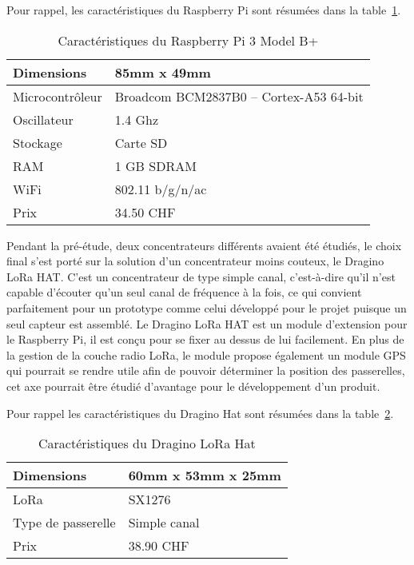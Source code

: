 Pour rappel, les caractéristiques du Raspberry Pi sont résumées dans la table~\ref{tab:raspberry_cara}.

\begin{table}[htb]
\caption{Caractéristiques du Raspberry Pi 3 Model B+}
\label{tab:raspberry_cara}
\centering
\begin{tabular}{ l | l }
\toprule
Dimensions & 85mm x 49mm \\
\midrule
Microcontrôleur & Broadcom BCM2837B0 – Cortex-A53 64-bit \\
\midrule
Oscillateur & 1.4 Ghz \\
\midrule
Stockage & Carte SD \\
\midrule
RAM & 1 GB SDRAM \\
\midrule
WiFi & 802.11 b/g/n/ac \\
\midrule
Prix & 34.50 CHF\\
\bottomrule 
\end{tabular}
\end{table}

Pendant la pré-étude, deux concentrateurs différents avaient été étudiés, le choix final s'est porté sur la solution d'un concentrateur moins couteux, le Dragino LoRa HAT. C'est un concentrateur de type simple canal, c'est-à-dire qu'il n'est capable d'écouter qu'un seul canal de fréquence à la fois, ce qui convient parfaitement pour un prototype comme celui développé pour le projet puisque un seul capteur est assemblé. Le Dragino LoRa HAT est un module d'extension pour le Raspberry Pi, il est conçu pour se fixer au dessus de lui facilement. En plus de la gestion de la couche radio LoRa, le module propose également un module GPS qui pourrait se rendre utile afin de pouvoir déterminer la position des passerelles, cet axe pourrait être étudié d'avantage pour le développement d'un produit.

Pour rappel les caractéristiques du Dragino Hat sont résumées dans la table~\ref{tab:dragino_cara}.

\begin{table}[htb]
\caption{Caractéristiques du Dragino LoRa Hat}
\label{tab:dragino_cara}
\centering
\begin{tabular}{ l | l }
\toprule
Dimensions & 60mm x 53mm x 25mm \\
\midrule
LoRa & SX1276 \\
\midrule
Type de passerelle & Simple canal \\
\midrule
Prix & 38.90 CHF \\
\bottomrule
\end{tabular}
\end{table}


